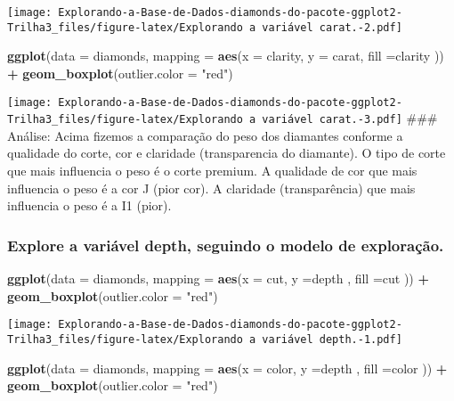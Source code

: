 \documentclass[
]{article}
\newenvironment{Shaded}{\begin{snugshade}}{\end{snugshade}}
\newcommand{\DataTypeTok}[1]{\textcolor[rgb]{0.13,0.29,0.53}{#1}}
\newcommand{\KeywordTok}[1]{\textcolor[rgb]{0.13,0.29,0.53}{\textbf{#1}}}
\newcommand{\NormalTok}[1]{#1}
\newcommand{\OperatorTok}[1]{\textcolor[rgb]{0.81,0.36,0.00}{\textbf{#1}}}
\newcommand{\StringTok}[1]{\textcolor[rgb]{0.31,0.60,0.02}{#1}}
\begin{document}
\texttt{[image: Explorando-a-Base-de-Dados-diamonds-do-pacote-ggplot2-Trilha3\_files/figure-latex/Explorando a variável carat.-2.pdf]}

\begin{Shaded}
\begin{Highlighting}[]
\KeywordTok{ggplot}\NormalTok{(}\DataTypeTok{data =}\NormalTok{ diamonds, }\DataTypeTok{mapping =} \KeywordTok{aes}\NormalTok{(}\DataTypeTok{x =}\NormalTok{ clarity, }\DataTypeTok{y =}\NormalTok{ carat, }\DataTypeTok{fill =}\NormalTok{clarity )) }\OperatorTok{+}\StringTok{ }\KeywordTok{geom_boxplot}\NormalTok{(}\DataTypeTok{outlier.color =} \StringTok{"red"}\NormalTok{)}
\end{Highlighting}
\end{Shaded}

\texttt{[image: Explorando-a-Base-de-Dados-diamonds-do-pacote-ggplot2-Trilha3\_files/figure-latex/Explorando a variável carat.-3.pdf]}
\#\#\# Análise: Acima fizemos a comparação do peso dos diamantes
conforme a qualidade do corte, cor e claridade (transparencia do
diamante). O tipo de corte que mais influencia o peso é o corte premium.
A qualidade de cor que mais influencia o peso é a cor J (pior cor). A
claridade (transparência) que mais influencia o peso é a I1 (pior).

\hypertarget{explore-a-variuxe1vel-depth-seguindo-o-modelo-de-explorauxe7uxe3o.}{%
\subsubsection{Explore a variável depth, seguindo o modelo de
exploração.}\label{explore-a-variuxe1vel-depth-seguindo-o-modelo-de-explorauxe7uxe3o.}}

\begin{Shaded}
\begin{Highlighting}[]
\KeywordTok{ggplot}\NormalTok{(}\DataTypeTok{data =}\NormalTok{ diamonds, }\DataTypeTok{mapping =} \KeywordTok{aes}\NormalTok{(}\DataTypeTok{x =}\NormalTok{ cut, }\DataTypeTok{y =}\NormalTok{depth , }\DataTypeTok{fill =}\NormalTok{cut )) }\OperatorTok{+}\StringTok{ }\KeywordTok{geom_boxplot}\NormalTok{(}\DataTypeTok{outlier.color =} \StringTok{"red"}\NormalTok{)}
\end{Highlighting}
\end{Shaded}

\texttt{[image: Explorando-a-Base-de-Dados-diamonds-do-pacote-ggplot2-Trilha3\_files/figure-latex/Explorando a variável depth.-1.pdf]}

\begin{Shaded}
\begin{Highlighting}[]
\KeywordTok{ggplot}\NormalTok{(}\DataTypeTok{data =}\NormalTok{ diamonds, }\DataTypeTok{mapping =} \KeywordTok{aes}\NormalTok{(}\DataTypeTok{x =}\NormalTok{ color, }\DataTypeTok{y =}\NormalTok{depth , }\DataTypeTok{fill =}\NormalTok{color )) }\OperatorTok{+}\StringTok{ }\KeywordTok{geom_boxplot}\NormalTok{(}\DataTypeTok{outlier.color =} \StringTok{"red"}\NormalTok{)}
\end{Highlighting}
\end{Shaded}
\end{document}
